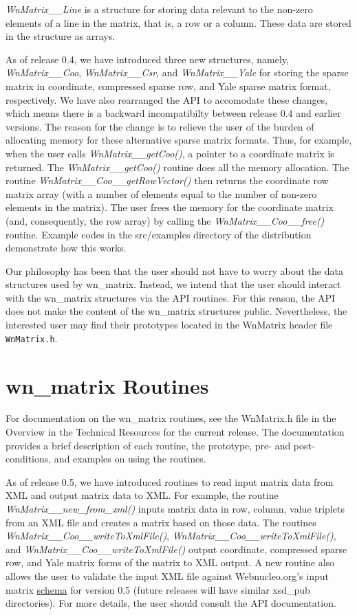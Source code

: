 \documentclass{article}    %
\begin{document}
{\em WnMatrix\_\_Line} is a structure for storing data relevant to the non-zero
elements of a line in the matrix, that is, a row or a column.  These data
are stored in the structure as arrays.

As of release 0.4, we have introduced three new structures, namely,
{\em WnMatrix\_\_Coo}, {\em WnMatrix\_\_Csr}, and {\em WnMatrix\_\_Yale}
for storing the sparse matrix in coordinate, compressed sparse row, and Yale
sparse matrix format, respectively.  We have also rearranged the API to
accomodate these changes, which means there is a backward incompatibilty between
release 0.4 and earlier versions.  The reason for the change is to relieve the
user of the burden of allocating memory for these alternative sparse matrix
formats.  Thus, for example, when the user calls {\em WnMatrix\_\_getCoo()},
a pointer to a coordinate matrix is returned.  The {\em WnMatrix\_\_getCoo()}
routine does all the memory allocation.  The routine
{\em WnMatrix\_\_Coo\_\_getRowVector()} then returns the coordinate row matrix
array (with a number of elements equal to the number of non-zero elements
in the matrix).  The user frees the memory for the coordinate matrix (and,
consequently, the row array) by calling the {\em WnMatrix\_\_Coo\_\_free()}
routine.  Example codes in the src/examples directory of the distribution
demonstrate how this works.

Our philosophy has been that the user should not have to worry about the
data structures used by wn\_matrix.  Instead, we intend that the user
should interact with the wn\_matrix structures via the API routines.
For this reason, the API does not make the content of
the wn\_matrix structures public.
Nevertheless, the interested user may find their prototypes located in the 
WnMatrix header file {\tt WnMatrix.h}.

\section{wn\_matrix Routines}

For documentation on the wn\_matrix routines, see the WnMatrix.h file
in the Overview in the Technical Resources for the current release.
The documentation provides a brief description of each routine, the prototype,
pre- and post-conditions, and examples on using the routines.

As of release 0.5, we have introduced routines to read input matrix data
from XML and output matrix data to XML.  For example, the routine
{\em WnMatrix\_\_new\_from\_xml()} inputs matrix data in row, column, value
triplets from an XML file and creates a matrix based on those data.  The
routines {\em WnMatrix\_\_Coo\_\_writeToXmlFile()},
{\em WnMatrix\_\_Coo\_\_writeToXmlFile()}, and
{\em WnMatrix\_\_Coo\_\_writeToXmlFile()} output coordinate, compressed sparse
row, and Yale matrix forms of the matrix to XML output.  A new routine
also allows the user to validate the input XML file
against Webnucleo.org's input matrix
\href{http://www.webnucleo.org/home/modules/wn_matrix/0.5/xsd_pub/coordinate_matrix.xsd}{schema}
for version 0.5 (future releases will have similar xsd\_pub directories).
For more details, the user should consult the API documentation.
\end{document}
